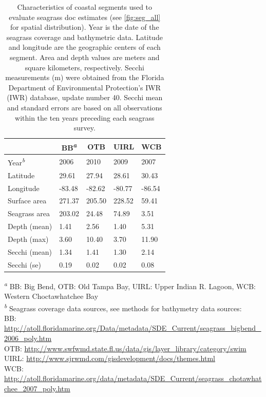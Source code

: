 \documentclass[letterpaper,12pt,oneside]{article}\usepackage[]{graphicx}\usepackage[]{color}
\begin{document}











\begin{table}[!tbp]
\caption{Characteristics of coastal segments used to evaluate seagrass \acl{doc} estimates (see \cref{fig:seg_all} for spatial distribution).  Year is the date of the seagrass coverage and bathymetric data.  Latitude and longitude are the geographic centers of each segment.  Area and depth values are meters and square kilometers, respectively.  Secchi measurements (m) were obtained from the Florida Department of Environmental Protection's \acl{IWR} (\acs{IWR}) database, update number 40.  Secchi mean and standard errors are based on all observations within the ten years preceding each seagrass survey.\label{tab:seg_summ}} 
\begin{center}
\begin{tabular}{lllll}
\hline\hline
\multicolumn{1}{l}{}&\multicolumn{1}{c}{BB\textsuperscript{\textit{a}}}&\multicolumn{1}{c}{OTB}&\multicolumn{1}{c}{UIRL}&\multicolumn{1}{c}{WCB}\tabularnewline
\hline
Year\textsuperscript{\textit{b}}&2006&2010&2009&2007\tabularnewline
Latitude& 29.61& 27.94& 28.61& 30.43\tabularnewline
Longitude&-83.48&-82.62&-80.77&-86.54\tabularnewline
Surface area&271.37&205.50&228.52& 59.41\tabularnewline
Seagrass area&203.02& 24.48& 74.89&  3.51\tabularnewline
Depth (mean)&  1.41&  2.56&  1.40&  5.31\tabularnewline
Depth (max)&  3.60& 10.40&  3.70& 11.90\tabularnewline
Secchi (mean)&  1.34&  1.41&  1.30&  2.14\tabularnewline
Secchi (se)&  0.19&  0.02&  0.02&  0.08\tabularnewline
\hline
\end{tabular}\end{center}

\footnotesize \textsuperscript{\textit{a}} BB: Big Bend, OTB: Old Tampa Bay, UIRL: Upper Indian R. Lagoon, WCB: Western Choctawhatchee Bay\\\textsuperscript{\textit{b}} Seagrass coverage data sources, see methods for bathymetry data sources:\scriptsize\\BB: \url{http://atoll.floridamarine.org/Data/metadata/SDE_Current/seagrass_bigbend_2006_poly.htm}\\OTB: \url{http://www.swfwmd.state.fl.us/data/gis/layer_library/category/swim}\\UIRL: \url{http://www.sjrwmd.com/gisdevelopment/docs/themes.html}\\WCB: \url{http://atoll.floridamarine.org/data/metadata/SDE_Current/seagrass_chotawhatchee_2007_poly.htm}\end{table}
\end{document}

